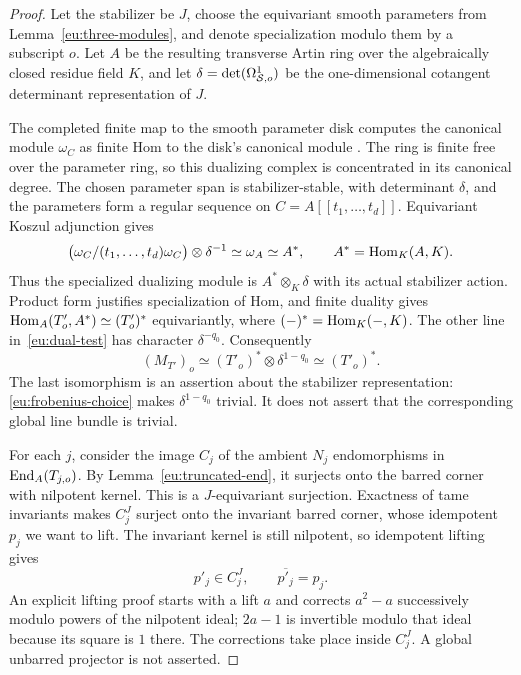 \begin{proof}
Let the stabilizer be $J$, choose the equivariant smooth parameters
from Lemma~\ref{eu:three-modules}, and denote specialization modulo
them by a subscript $o$.  Let $A$ be the resulting transverse Artin
ring over the algebraically closed residue field $K$, and let
$\delta=\det(\Omega^1_{\mathcal S,o})$ be the one-dimensional cotangent
determinant representation of $J$.

The completed finite map to the smooth parameter disk computes the
canonical module $\omega_C$ as finite Hom to the disk's canonical
module \cite[Tag 0AX0]{StacksProject}.  The ring is finite free over
the parameter ring, so this dualizing complex is concentrated in its
canonical degree.  The chosen parameter span is stabilizer-stable,
with determinant $\delta$, and the parameters form a regular sequence
on $C=A[[t_1,\ldots,t_d]]$.  Equivariant Koszul adjunction gives
\[
 \bigl(\omega_C/(t_1,\ldots,t_d)\omega_C\bigr)
       \otimes\delta^{-1}
       \simeq\omega_A\simeq A^*,
 \qquad A^*=\operatorname{Hom}_K(A,K).
\]
Thus the specialized dualizing module is $A^*\otimes_K\delta$ with its
actual stabilizer action.  Product form justifies specialization of
Hom, and finite duality gives
$\operatorname{Hom}_A(T'_o,A^*)\simeq(T'_o)^*$ equivariantly, where
$(-)^*=\operatorname{Hom}_K(-,K)$.  The other line in~\eqref{eu:dual-test} has
character $\delta^{-q_0}$.  Consequently
\begin{equation}\label{eu:det-cancellation}
              (M_{T'})_o\simeq(T'_o)^*\otimes\delta^{1-q_0}
                            \simeq(T'_o)^*.
\end{equation}
The last isomorphism is an assertion about the stabilizer
representation: \eqref{eu:frobenius-choice} makes
$\delta^{1-q_0}$ trivial.  It does not assert that the corresponding
global line bundle is trivial.

For each $j$, consider the image $C_j$ of the ambient $N_j$
endomorphisms in $\operatorname{End}_A(T_{j,o})$.  By
Lemma~\ref{eu:truncated-end}, it surjects onto the barred corner with
nilpotent kernel.  This is a $J$-equivariant surjection.  Exactness of
tame invariants makes $C_j^J$ surject onto the invariant barred
corner, whose idempotent $p_j$ we want to lift.  The invariant kernel
is still nilpotent, so idempotent lifting gives
\[
                    p'_j\in C_j^J,\qquad \overline{p'_j}=p_j.
\]
An explicit lifting proof starts with a lift $a$ and corrects
$a^2-a$ successively modulo powers of the nilpotent ideal; $2a-1$
is invertible modulo that ideal because its square is $1$ there.
The corrections take place inside $C_j^J$.  A global unbarred
projector is not asserted.


\end{proof}
